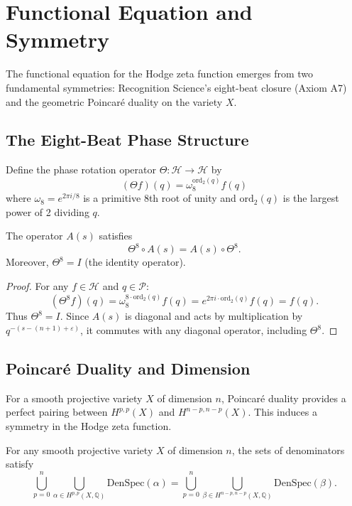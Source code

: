 \section{Functional Equation and Symmetry}
\label{sec:functional-equation}

The functional equation for the Hodge zeta function emerges from two fundamental symmetries: Recognition Science's eight-beat closure (Axiom A7) and the geometric Poincaré duality on the variety $X$.

\subsection{The Eight-Beat Phase Structure}

\begin{definition}
Define the phase rotation operator $\Theta: \mathcal{H} \to \mathcal{H}$ by
\[
(\Theta f)(q) = \omega_8^{\text{ord}_2(q)} f(q)
\]
where $\omega_8 = e^{2\pi i/8}$ is a primitive 8th root of unity and $\text{ord}_2(q)$ is the largest power of 2 dividing $q$.
\end{definition}

\begin{lemma}
The operator $A(s)$ satisfies
\[
\Theta^8 \circ A(s) = A(s) \circ \Theta^8.
\]
Moreover, $\Theta^8 = I$ (the identity operator).
\end{lemma}

\begin{proof}
For any $f \in \mathcal{H}$ and $q \in \mathcal{P}$:
\[
(\Theta^8 f)(q) = \omega_8^{8 \cdot \text{ord}_2(q)} f(q) = e^{2\pi i \cdot \text{ord}_2(q)} f(q) = f(q).
\]
Thus $\Theta^8 = I$. Since $A(s)$ is diagonal and acts by multiplication by $q^{-(s-(n+1)+\varepsilon)}$, it commutes with any diagonal operator, including $\Theta^8$.
\end{proof}

\subsection{Poincaré Duality and Dimension}

For a smooth projective variety $X$ of dimension $n$, Poincaré duality provides a perfect pairing between $H^{p,p}(X)$ and $H^{n-p,n-p}(X)$. This induces a symmetry in the Hodge zeta function.

\begin{lemma}
\label{lem:poincare}
For any smooth projective variety $X$ of dimension $n$, the sets of denominators satisfy
\[
\bigcup_{p=0}^n \bigcup_{\alpha \in H^{p,p}(X,\mathbb{Q})} \text{DenSpec}(\alpha) = \bigcup_{p=0}^n \bigcup_{\beta \in H^{n-p,n-p}(X,\mathbb{Q})} \text{DenSpec}(\beta).
\]
\end{lemma}

